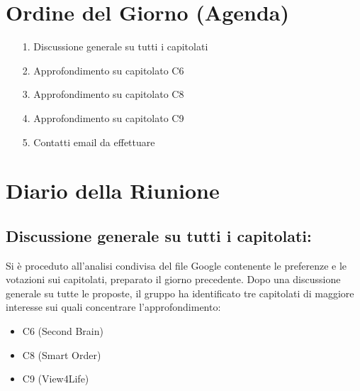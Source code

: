 \documentclass[a4paper, 11pt, oneside]{scrartcl} %
\begin{document}
\newpage
\section{Ordine del Giorno (Agenda)}
\begin{itemize}
    \item[1.] Discussione generale su tutti i capitolati
    \item[2.] Approfondimento su capitolato C6
    \item[3.] Approfondimento su capitolato C8
    \item[4.] Approfondimento su capitolato C9
    \item[5.] Contatti email da effettuare
\end{itemize}

\newpage
\section{Diario della Riunione}

\subsection{Discussione generale su tutti i capitolati:}

Si è proceduto all'analisi condivisa del file Google contenente le preferenze e le votazioni sui capitolati, preparato il giorno precedente. Dopo una discussione generale su tutte le proposte, il gruppo ha identificato tre capitolati di maggiore interesse sui quali concentrare l'approfondimento:
\begin{itemize}
    \item C6 (Second Brain)
    \item C8 (Smart Order)
    \item C9 (View4Life)
\end{itemize}
\end{document}
